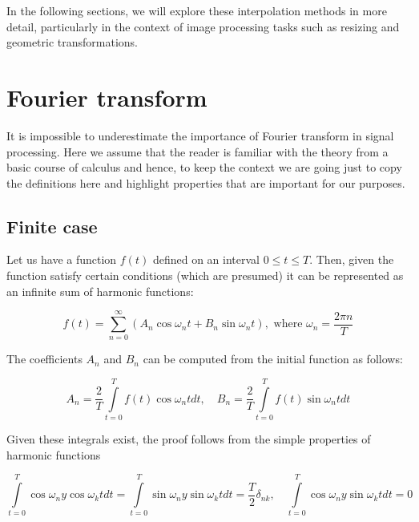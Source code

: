 \documentclass[11pt]{book}
\begin{document}
In the following sections, we will explore these interpolation methods in more detail, particularly in the context of image processing tasks such as resizing and geometric transformations.




\section{Fourier transform}

It is impossible to underestimate the importance of Fourier transform in signal processing. Here we assume that the reader is familiar with the theory from a basic course of calculus and hence, to keep the context we are going just to copy the definitions here and highlight properties that are important for our purposes.

\subsection{Finite case}

Let us have a function $f(t)$ defined on an interval $ 0 \leq t \leq T$. Then, given the function satisfy certain conditions (which are presumed) it can be represented as an infinite sum of harmonic functions:

\begin{equation}
f(t) = \sum\limits_{n=0}^\infty \left(A_n \cos{\omega_n t} + B_n \sin{\omega_n t}\right), \text{ where } \omega_n = \frac{2 \pi n}{T}\label{fourier_finite}
\end{equation}

The coefficients $A_n$ and $B_n$ can be computed from the initial function as follows:

\begin{equation}
A_n = \frac{2}{T}\int\limits_{t=0}^T f(t) \cos{\omega_n t} dt,\quad B_n = \frac{2}{T}\int\limits_{t=0}^T f(t) \sin{\omega_n t} dt\label{fourier_finite_coefficients}
\end{equation}

Given these integrals exist, the proof follows from the simple properties of harmonic functions

\begin{equation}
\int\limits_{t=0}^T \cos{\omega_n}y \cos{\omega_kt} dt = \int\limits_{t=0}^T \sin{\omega_n}y \sin{\omega_kt} dt = \frac{T}{2}\delta_{nk},\quad \int\limits_{t=0}^T \cos{\omega_n}y \sin{\omega_kt} dt = 0
\end{equation}
\end{document}
